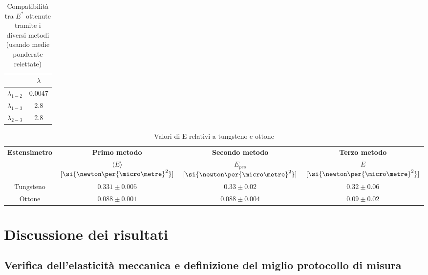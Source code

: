 \documentclass[a4paper,11pt,oneside]{article}
\begin{document}


\begin{table}[h!]
\centering
\caption{Compatibilità tra $E^{\ast}$ ottenute tramite i diversi metodi (usando medie ponderate reiettate)}
\label{tab:compatibilità_e_star}
    \begin{tabular}{|c|c|}
        \hline
        & $\lambda$\\ \hline
        {\cellcolor[rgb]{0.85,0.85,0.85}}$\lambda_{1-2}$ & {\cellcolor[rgb]{0.85,0.85,0.85}}0.0047\\ \hline
        $\lambda_{1-3}$ & 2.8\\ \hline
        {\cellcolor[rgb]{0.85,0.85,0.85}}$\lambda_{2-3}$ & {\cellcolor[rgb]{0.85,0.85,0.85}}2.8 \\ \hline
    \end{tabular}
\end{table}

\begin{table}[h!]
    \centering
    \caption{Valori di E relativi a tungsteno e ottone}
    \label{tab:tungsteno_ottone}
    \begin{tabular}{|c|c|c|c|}
        \hline
        \multirow{2}{*}{\textbf{Estensimetro}} & \textbf{Primo metodo} & \textbf{Secondo metodo} & \textbf{Terzo metodo} \\
		& $\langle E \rangle$ $[\si{\newton\per{\micro\metre}^2}]$ &    $E_{pes}$ $[\si{\newton\per{\micro\metre}^2}]$ &  $\overline{E}$ $[\si{\newton\per{\micro\metre}^2}]$\\  \hline
        {\cellcolor[rgb]{0.85,0.85,0.85}}Tungsteno & {\cellcolor[rgb]{0.85,0.85,0.85}}$0.331 \pm 0.005$ & {\cellcolor[rgb]{0.85,0.85,0.85}}$0.33 \pm 0.02$ & {\cellcolor[rgb]{0.85,0.85,0.85}}$0.32 \pm 0.06$\\ \hline
        Ottone & $0.088 \pm 0.001$ & $0.088 \pm 0.004$ & $0.09 \pm 0.02$\\ \hline
    \end{tabular}
\end{table}

\section{Discussione dei risultati}
\subsection{Verifica dell'elasticità meccanica e definizione del miglio protocollo di misura}\label{sec:discussione_prima_parte}
\end{document}
